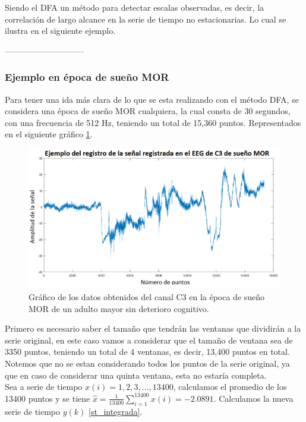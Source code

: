 \documentclass[letterpaper,titlepage,12pt,draft]{report}
\begin{document}
Siendo el DFA un m\'etodo para detectar escalas observadas, es decir, la correlaci\'on de largo alcance en la serie de tiempo no estacionarias. Lo cual se ilustra en el siguiente ejemplo. 

-----------------------------%

\subsubsection{Ejemplo en \'epoca de sue\~no MOR}

Para tener una ida m\'as clara de lo que se esta realizando con el m\'etodo DFA, se considera una \'epoca de sue\~no MOR cualquiera, la cual consta de 30 segundos, con una frecuencia de 512 Hz, teniendo un total de 15,360 puntos. Representados en el siguiente gr\'afico \ref{ejemplo}.  

\begin{figure}[H]
\begin{center}
\includegraphics[scale=0.3]{Ejemplo.png}
\caption{Gr\'afico de los datos obtenidos del canal C3 en la \'epoca de sue\~no MOR de un adulto mayor sin deterioro cognitivo.}
\label{ejemplo}
\end{center}
\end{figure}

Primero es necesario saber el tama\~no que tendr\'an las ventanas que dividir\'an a la serie original, en este caso vamos a considerar que el tama\~no de ventana sea de 3350 puntos, teniendo un total de 4 ventanas, es decir, 13,400 puntos en total. Notemos que no se estan considerando todos los puntos de la serie original, ya que en caso de considerar una quinta ventana, esta no estar\'ia completa.\\

Sea a serie de tiempo $x(i)=1,2,3,...,13400$, calculamos el promedio de los 13400 puntos y se tiene $\displaystyle \hat{x}=\frac{1}{13400} \sum_{i=1}^{13400} x(i)=-2.0891$. Calculamos la nueva serie de tiempo $y(k)$ \eqref{st_integrada}.\\
\end{document}
